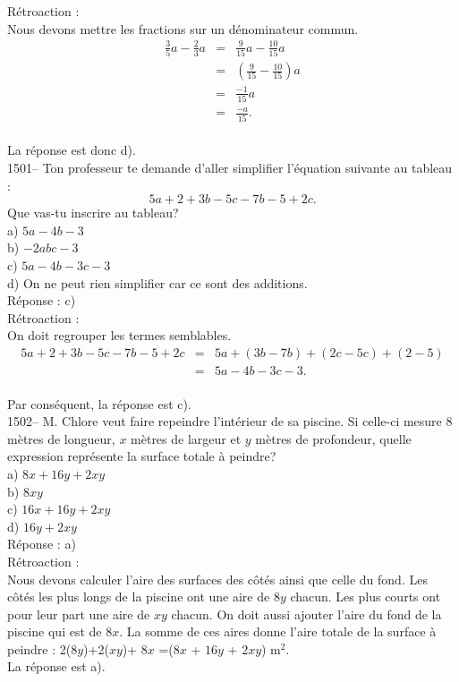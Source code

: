 R\'etroaction :\\
Nous devons mettre les fractions sur un d\'enominateur commun.
\begin{eqnarray*}
\frac{3}{5}a-\frac{2}{3}a&=&\frac{9}{15}a-\frac{10}{15}a\\[3mm]&=&(\frac{9}{15}-\frac{10}{15})a\\[3mm]&=&\frac{-1}{15}a\\[3mm]&=&\frac{-a}{15}.
\end{eqnarray*}\\
La r\'eponse est donc d).\\

1501-- Ton professeur te demande d'aller simplifier l'\'equation
suivante au tableau :$$5a+2+3b-5c-7b-5+2c.$$ Que vas-tu inscrire au
tableau?\\
a) $5a-4b-3$\\
b) $-2abc-3$\\
c) $5a-4b-3c-3$\\
d) On ne peut rien simplifier car ce sont des additions.\\

R\'eponse : c)\\

R\'etroaction :\\
On doit regrouper les termes semblables.
\begin{eqnarray*}
5a+2+3b-5c-7b-5+2c &=& 5a+(3b-7b)+(2c-5c)+(2-5)\\&=& 5a-4b-3c-3.
\end{eqnarray*}\\Par cons\'equent, la r\'eponse est c).\\

1502-- M. Chlore veut faire repeindre l'int\'erieur de sa piscine. Si
celle-ci mesure 8  m\`etres de longueur, $x$  m\`etres de largeur et
$y$  m\`etres de profondeur, quelle expression
repr\'esente la surface totale \`a peindre?\\
a) $8x+16y+2xy$\\
b) $8xy$\\
c) $16x+16y+2xy$\\
d) $16y+2xy$\\

R\'eponse : a)\\

R\'etroaction :\\
Nous devons calculer l'aire des surfaces des c\^ot\'es ainsi que
celle du fond. Les c\^ot\'es les plus longs de la piscine ont une
aire de $8y$ chacun. Les plus courts ont pour leur part une aire de
$xy$ chacun. On doit aussi ajouter l'aire du fond de la piscine qui
est de $8x$. La somme de ces aires donne l'aire totale de la surface
\`a peindre : 2($8 y$)+2($xy$)+ $8 x$ =($8 x$ + $16 y$ + $2 xy$)
m$^2$. \\La r\'eponse est a).\\

